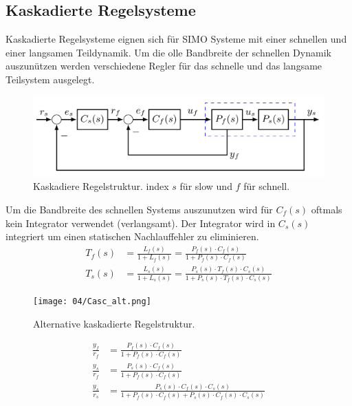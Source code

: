 \subsection{Kaskadierte Regelsysteme}
    Kaskadierte Regelsysteme eignen sich für SIMO Systeme mit einer schnellen und einer langsamen Teildynamik. Um die olle Bandbreite der schnellen Dynamik auszunützen werden verschiedene Regler für das schnelle und das langsame Teilsystem ausgelegt.
    
    \begin{figure}[H]
        \centering
        \includegraphics[width = 0.7\linewidth]{images/04/kaskad_sys.jpeg}
        \caption{Kaskadiere Regelstruktur. index $s$ für slow und $f$ für schnell.}
    \end{figure}
    Um die Bandbreite des schnellen Systems auszunutzen wird für $C_f(s)$ oftmals kein Integrator verwendet (verlangsamt). Der Integrator wird in $C_s(s)$ integriert um einen statischen Nachlauffehler zu eliminieren.
    \begin{align*}
        T_{f}(s) &= \frac{L_f(s)}{1 + L_f(s)} = \frac{P_f(s)\cdot C_f(s)}{1 + P_f(s)\cdot C_f(s)}\\
        T_{s}(s) &= \frac{L_s(s)}{1 + L_s(s)} = \frac{P_s(s)\cdot T_{f}(s)\cdot C_s(s)}{1 + P_s(s)\cdot T_f(s) \cdot C_s(s)}
    \end{align*}
    
    \begin{figure}[H]
        \centering
        \texttt{[image: 04/Casc\_alt.png]}
        \caption{Alternative kaskadierte Regelstruktur.}
        \label{fig:my_label}
    \end{figure}
    
    \begin{align*}
        \frac{y_f}{r_f} &= \frac{P_f(s)\cdot C_f(s)}{1 + P_f(s)\cdot C_f(s)}\\
        \frac{y_s}{r_f} &= \frac{P_s(s)\cdot C_f(s)}{1 + P_f(s)\cdot C_f(s)}\\
        \frac{y_s}{r_s} &= \frac{P_s(s)\cdot C_f(s) \cdot C_s(s)}{1 + P_f(s) \cdot C_f(s) + P_s(s) \cdot C_f(s) \cdot C_s(s)}
    \end{align*}
    
